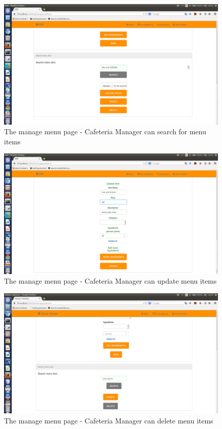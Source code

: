 \documentclass[a4paper,12pt]{article}
\begin{document}
\begin{figure}[H]
  \centering
    \includegraphics[width=1.0\textwidth]{screenshots/searchMenuItem.png}
    \caption{The manage menu page - Cafeteria Manager can search for menu items}
\end{figure}

\begin{figure}[H]
  \centering
    \includegraphics[width=1.0\textwidth]{screenshots/updateMenu.png}
    \caption{The manage menu page - Cafeteria Manager can update menu items}
\end{figure}

\begin{figure}[H]
  \centering
    \includegraphics[width=1.0\textwidth]{screenshots/deleteHam.png}
    \caption{The manage menu page - Cafeteria Manager can delete menu items}
\end{figure}
\end{document}
